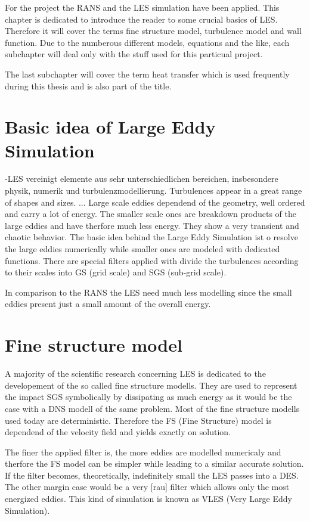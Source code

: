 For the project the RANS and the LES simulation have been applied. This chapter is dedicated to introduce the reader to some crucial basics of LES. Therefore it will cover the terms fine structure model, turbulence model and wall function. Due to the numberous different models, equations and the like, each subchapter will deal only with the stuff used for this particual project.

The last subchapter will cover the term heat transfer which is used frequently during this thesis and is also part of the title.
\section{Basic idea of Large Eddy Simulation}
-LES vereinigt elemente aus sehr unterschiedlichen bereichen, insbesondere physik, numerik und turbulenzmodellierung.
Turbulences appear in a great range of shapes and sizes. ... 
Large scale eddies dependend of the geometry, well ordered and carry a lot of energy. The smaller scale ones are breakdown products of the large eddies and have therfore much less energy. They show a very transient and chaotic behavior. The basic idea behind the Large Eddy Simulation ist o resolve the large eddies numerically while smaller ones are modeled with dedicated functions. There are special filters applied with divide the turbulences according to their scales into GS (grid scale) and SGS (sub-grid scale).

In comparison to the RANS the LES need much less modelling since the small eddies present just a small amount of the overall energy.
\section{Fine structure model}
A majority of the scientific research concerning LES is dedicated to the developement of the so called fine structure modells. They are used to represent the impact SGS symbolically by dissipating as much energy as it would be the case with a DNS modell of the same problem. Most of the fine structure modells used today are deterministic. Therefore the FS (Fine Structure) model is dependend of the velocity field and yields exactly on solution.

The finer the applied filter is, the more eddies are modelled numericaly and therfore the FS model can be simpler while leading to a similar accurate solution. If the filter becomes, theoretically, indefinitely small the LES passes into a DES. The other margin case would be a very [rau] filter which allows only the most energized eddies. This kind of simulation is known as VLES (Very Large Eddy Simulation).

